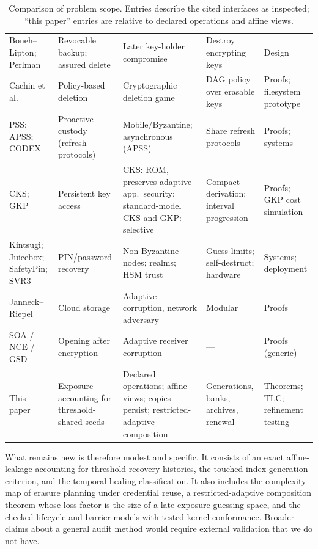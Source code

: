 \documentclass[pdflatex,sn-mathphys-num]{sn-jnl}%
\theoremstyle{plain}
\theoremstyle{definition}
\begin{document}
\begin{table}[t]
\caption{Comparison of problem scope. Entries describe the cited interfaces as inspected; ``this paper'' entries are relative to declared operations and affine views.}\label{tab:comparison}
\centering\footnotesize
\altrows
\begin{tabularx}{\linewidth}{@{}>{\raggedright\arraybackslash}p{.15\linewidth}YYYY@{}}\toprule
{} &  &  &  & \\\midrule
Boneh--Lipton; Perlman & Revocable backup; assured delete & Later key-holder compromise & Destroy encrypting keys & Design\\
Cachin et al. & Policy-based deletion & Cryptographic deletion game & DAG policy over erasable keys & Proofs; filesystem prototype\\
PSS; APSS; CODEX & Proactive custody (refresh protocols) & Mobile/Byzantine; asynchronous (APSS) & Share refresh protocols & Proofs; systems\\
CKS; GKP & Persistent key access & CKS: ROM, preserves adaptive app.\ security; standard-model CKS and GKP: selective & Compact derivation; interval progression & Proofs; GKP cost simulation\\
Kintsugi; Juicebox; SafetyPin; SVR3 & PIN/password recovery & Non-Byzantine nodes; realms; HSM trust & Guess limits; self-destruct; hardware & Systems; deployment\\
Janneck--Riepel & Cloud storage & Adaptive corruption, network adversary & Modular & Proofs\\
SOA / NCE / GSD & Opening after encryption & Adaptive receiver corruption & --- & Proofs (generic)\\
This paper & Exposure accounting for threshold-shared seeds & Declared operations; affine views; copies persist; restricted-adaptive composition & Generations, banks, archives, renewal & Theorems; TLC; refinement testing\\\bottomrule
\end{tabularx}
\end{table}

What remains new is therefore modest and specific. It consists of an exact affine-leakage accounting for threshold recovery histories, the touched-index generation criterion, and the temporal healing classification. It also includes the complexity map of erasure planning under credential reuse, a restricted-adaptive composition theorem whose loss factor is the size of a late-exposure guessing space, and the checked lifecycle and barrier models with tested kernel conformance. Broader claims about a general audit method would require external validation that we do not have.
\end{document}
